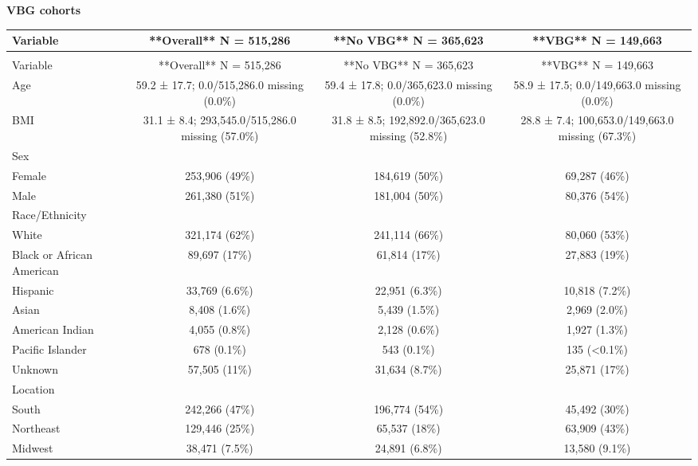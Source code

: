 \documentclass[
  11pt,
  letterpaper,
  DIV=11,
  numbers=noendperiod]{scrartcl}
\begin{document}
\endgroup{}

\begin{center}\textbf{VBG cohorts}\end{center}

\begingroup\fontsize{7}{9}\selectfont

\begin{longtable*}{>{\raggedright\arraybackslash}p{2.0in}ccc}
\toprule
Variable & **Overall**  N = 515,286 & **No VBG**  N = 365,623 & **VBG**  N = 149,663\\
\midrule
\endfirsthead
{}\\
\toprule
Variable & **Overall**  N = 515,286 & **No VBG**  N = 365,623 & **VBG**  N = 149,663\\
\midrule
\endhead

\endfoot
\bottomrule
\endlastfoot
Age & 59.2 ± 17.7; 0.0/515,286.0 missing (0.0\%) & 59.4 ± 17.8; 0.0/365,623.0 missing (0.0\%) & 58.9 ± 17.5; 0.0/149,663.0 missing (0.0\%)\\
BMI & 31.1 ± 8.4; 293,545.0/515,286.0 missing (57.0\%) & 31.8 ± 8.5; 192,892.0/365,623.0 missing (52.8\%) & 28.8 ± 7.4; 100,653.0/149,663.0 missing (67.3\%)\\
Sex &  &  & \\
Female & 253,906 (49\%) & 184,619 (50\%) & 69,287 (46\%)\\
Male & 261,380 (51\%) & 181,004 (50\%) & 80,376 (54\%)\\
\addlinespace
Race/Ethnicity &  &  & \\
White & 321,174 (62\%) & 241,114 (66\%) & 80,060 (53\%)\\
Black or African American & 89,697 (17\%) & 61,814 (17\%) & 27,883 (19\%)\\
Hispanic & 33,769 (6.6\%) & 22,951 (6.3\%) & 10,818 (7.2\%)\\
Asian & 8,408 (1.6\%) & 5,439 (1.5\%) & 2,969 (2.0\%)\\
\addlinespace
American Indian & 4,055 (0.8\%) & 2,128 (0.6\%) & 1,927 (1.3\%)\\
Pacific Islander & 678 (0.1\%) & 543 (0.1\%) & 135 (<0.1\%)\\
Unknown & 57,505 (11\%) & 31,634 (8.7\%) & 25,871 (17\%)\\
Location &  &  & \\
South & 242,266 (47\%) & 196,774 (54\%) & 45,492 (30\%)\\
\addlinespace
Northeast & 129,446 (25\%) & 65,537 (18\%) & 63,909 (43\%)\\
Midwest & 38,471 (7.5\%) & 24,891 (6.8\%) & 13,580 (9.1\%)\\

\end{longtable*}
\end{document}
